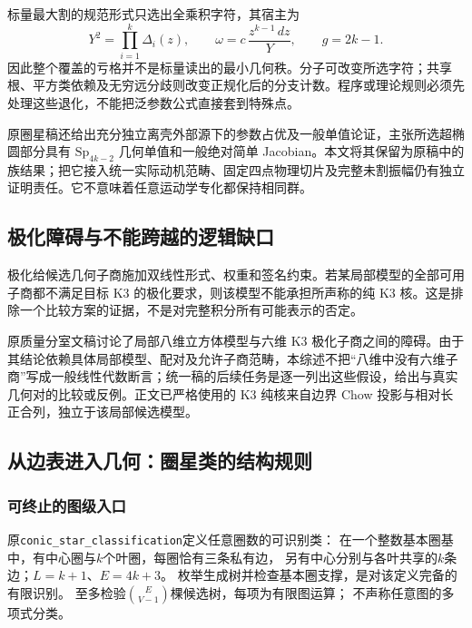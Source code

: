 \documentclass[11pt,a4paper,oneside]{ctexart}
\theoremstyle{cnplain}
\theoremstyle{definition}
\theoremstyle{remark}
\newcommand{\Q}{\mathbb Q}
\newcommand{\im}{\operatorname{im}}
\newcommand{\dR}{\mathrm{dR}}
\numberwithin{equation}{section}
\begin{document}
标量最大割的规范形式只选出全乘积字符，其宿主为
\begin{equation}
 Y^2=\prod_{i=1}^k\Delta_i(z),\qquad
 \omega=c\,\frac{z^{k-1}\,dz}{Y},\qquad g=2k-1.
\end{equation}
因此整个覆盖的亏格并不是标量读出的最小几何秩。分子可改变所选字符；共享根、平方类依赖及无穷远分歧则改变正规化后的分支计数。程序或理论规则必须先处理这些退化，不能把泛参数公式直接套到特殊点。

原圈星稿还给出充分独立离壳外部源下的参数占优及一般单值论证，主张所选超椭圆部分具有 $\mathrm{Sp}_{4k-2}$ 几何单值和一般绝对简单 Jacobian。本文将其保留为原稿中的族结果；把它接入统一实际动机范畴、固定四点物理切片及完整未割振幅仍有独立证明责任。它不意味着任意运动学专化都保持相同群。


\subsection{极化障碍与不能跨越的逻辑缺口}
极化给候选几何子商施加双线性形式、权重和签名约束。若某局部模型的全部可用子商都不满足目标 K3 的极化要求，则该模型不能承担所声称的纯 K3 核。这是排除一个比较方案的证据，不是对完整积分所有可能表示的否定。

原质量分室文稿讨论了局部八维立方体模型与六维 K3 极化子商之间的障碍。由于其结论依赖具体局部模型、配对及允许子商范畴，本综述不把``八维中没有六维子商''写成一般线性代数断言；统一稿的后续任务是逐一列出这些假设，给出与真实几何对的比较或反例。正文已严格使用的 K3 纯核来自边界 Chow 投影与相对长正合列，独立于该局部候选模型。


\endgroup

\begingroup
\providecommand{\Q}{\mathbb Q}\providecommand{\cC}{\mathcal C}
\providecommand{\cS}{\mathcal S}\providecommand{\dR}{\mathrm{dR}}
\providecommand{\rk}{\operatorname{rk}}\providecommand{\im}{\operatorname{im}}
\subsection{从边表进入几何：圈星类的结构规则}
\subsubsection{可终止的图级入口}
原\nolinkurl{conic_star_classification}定义任意圈数的可识别类：
在一个整数基本圈基中，有中心圈与$k$个叶圈，每圈恰有三条私有边，
另有中心分别与各叶共享的$k$条边；$L=k+1$、$E=4k+3$。
枚举生成树并检查基本圈支撑，是对该定义完备的有限识别。
至多检验$\binom{E}{V-1}$棵候选树，每项为有限图运算；
不声称任意图的多项式分类。
\end{document}
